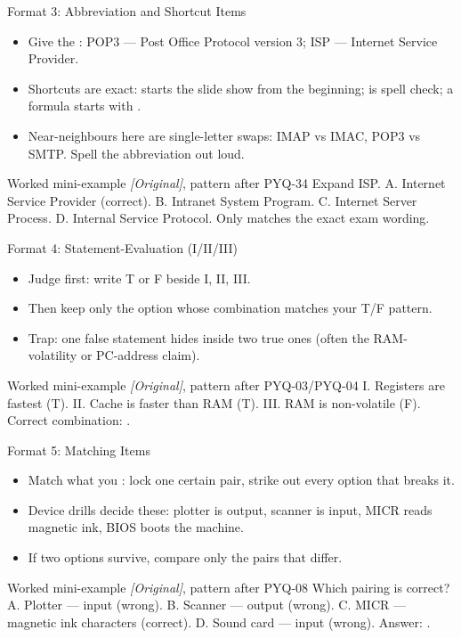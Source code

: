 \documentclass[aspectratio=169]{beamer}
\begin{document}
\begin{frame}{Format 3: Abbreviation and Shortcut Items}
  \begin{itemize}
    \item Give the : POP3 --- Post Office
      Protocol version 3; ISP --- Internet Service Provider.
    \item Shortcuts are exact:  starts the slide show from the
      beginning;  is spell check; a formula starts with \key{=}.
    \item Near-neighbours here are single-letter swaps: IMAP vs IMAC,
      POP3 vs SMTP. Spell the abbreviation out loud.
  \end{itemize}
  \begin{exampleblock}{Worked mini-example \textit{[Original]}, pattern after PYQ-34}
    Expand ISP. A. Internet Service Provider (correct). B. Intranet System
    Program. C. Internet Server Process. D. Internal Service Protocol.
    Only  matches the exact exam wording.
  \end{exampleblock}
\end{frame}

\begin{frame}{Format 4: Statement-Evaluation (I/II/III)}
  \begin{itemize}
    \item Judge  first: write T or F beside
      I, II, III.
    \item Then keep only the option whose combination matches your T/F
      pattern.
    \item Trap: one false statement hides inside two true ones (often the
      RAM-volatility or PC-address claim).
  \end{itemize}
  \begin{exampleblock}{Worked mini-example \textit{[Original]}, pattern after PYQ-03/PYQ-04}
    I. Registers are fastest (T). II. Cache is faster than RAM (T).
    III. RAM is non-volatile (F). Correct combination: .
  \end{exampleblock}
\end{frame}

\begin{frame}{Format 5: Matching Items}
  \begin{itemize}
    \item Match what you : lock one certain pair, strike
      out every option that breaks it.
    \item Device drills decide these: plotter is output, scanner is input,
      MICR reads magnetic ink, BIOS boots the machine.
    \item If two options survive, compare only the pairs that differ.
  \end{itemize}
  \begin{exampleblock}{Worked mini-example \textit{[Original]}, pattern after PYQ-08}
    Which pairing is correct? A. Plotter --- input (wrong). B. Scanner ---
    output (wrong). C. MICR --- magnetic ink characters (correct).
    D. Sound card --- input (wrong). Answer: .
  \end{exampleblock}
\end{frame}
\end{document}
